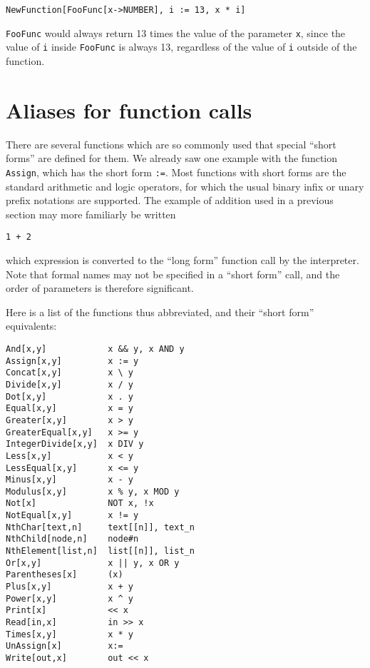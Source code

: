 \begin{verbatim}
NewFunction[FooFunc[x->NUMBER], i := 13, x * i]
\end{verbatim}

\noindent \verb+FooFunc+ would always return 13 times the value of the
parameter \verb+x+, since the value of \verb+i+ inside \verb+FooFunc+
is always 13, regardless of the value of \verb+i+ outside of the
function.

\section{Aliases for function calls}

There are several functions which are so commonly used that special
``short forms'' are defined for them.  We already saw one example with
the function \verb+Assign+, which has the short form \verb+:=+.  Most
functions with short forms are the standard arithmetic and logic
operators, for which the usual binary infix or unary prefix notations
are supported.  The example of addition used in a previous section may
more familiarly be written

\begin{verbatim}
1 + 2
\end{verbatim}

\noindent which expression is converted to the ``long form'' function
call by the interpreter.  Note that formal names may not be specified
in a ``short form'' call, and the order of parameters is therefore
significant.

Here is a list of the functions thus abbreviated, and their ``short
form'' equivalents:

\medskip
\begin{multicols}{2}
\begin{verbatim}
And[x,y]            x && y, x AND y 
Assign[x,y]         x := y 
Concat[x,y]         x \ y 
Divide[x,y]         x / y
Dot[x,y]            x . y 
Equal[x,y]          x = y 
Greater[x,y]        x > y 
GreaterEqual[x,y]   x >= y
IntegerDivide[x,y]  x DIV y 
Less[x,y]           x < y 
LessEqual[x,y]      x <= y 
Minus[x,y]          x - y 
Modulus[x,y]        x % y, x MOD y 
Not[x]              NOT x, !x 
NotEqual[x,y]       x != y 
NthChar[text,n]     text[[n]], text_n 
NthChild[node,n]    node#n  
NthElement[list,n]  list[[n]], list_n
Or[x,y]             x || y, x OR y 
Parentheses[x]      (x) 
Plus[x,y]           x + y 
Power[x,y]          x ^ y 
Print[x]            << x
Read[in,x]          in >> x 
Times[x,y]          x * y 
UnAssign[x]         x:=
Write[out,x]        out << x 
\end{verbatim}
\end{multicols}

